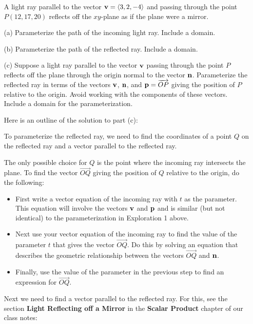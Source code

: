 \documentclass{ximera}
\begin{document}
\begin{question}  \label{Qdr5577:Lines}
A light ray parallel to the vector ${\bf v} = \langle 3,2,-4 \rangle$ and passing through the point $P(12, 17,20)$ reflects off the $xy$-plane as if the plane were a mirror.

(a) Parameterize the path of the incoming light ray. Include a domain.

(b) Parameterize the path of the reflected ray. Include a domain.

(c) Suppose a light ray parallel to the vector ${\bf v}$ passing through the point $P$ reflects off the plane through the origin normal to the vector ${\bf n}$. Parameterize the reflected ray in terms of the vectors ${\bf v}$, ${\bf n}$, and ${\bf p} = \overrightarrow{OP}$ giving the position of $P$ relative to the origin. Avoid working with the components of these vectors. Include a domain for the parameterization.

Here is an outline of the solution to part (c):

To parameterize the reflected ray, we need to find the coordinates of a point $Q$ on the reflected ray and a vector parallel to the reflected ray. 

The only possible choice for $Q$ is the point where the incoming ray intersects the plane. To find the vector $\overrightarrow{OQ}$ giving the position of $Q$ relative to the origin, do the following:

\begin{itemize}

\item{First write a vector equation of the incoming ray with $t$ as the parameter. This equation will involve the vectors ${\bf v}$ and ${\bf  p}$ and is similar (but not identical) to the parameterization in Exploration 1 above.} 

\item{Next use your vector equation of the incoming ray to find the value of the parameter $t$ that gives the vector $\overrightarrow{OQ}$. Do this by solving an equation that describes the geometric relationship between the vectors $\overrightarrow{OQ}$ and ${\bf n}$. }

\item{Finally, use the value of the parameter in the previous step to find an expression for $\overrightarrow{OQ}$.}

\end{itemize}

Next we need to find a vector parallel to the reflected ray. For this, see the section {\bf Light Reflecting off a Mirror} in the {\bf Scalar Product} chapter of our class notes:


\end{question}
\end{document}

